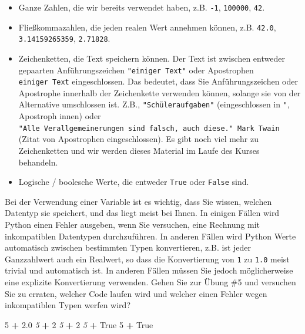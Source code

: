 \documentclass[
]{book}
\newenvironment{Shaded}{\begin{snugshade}}{\end{snugshade}}
\newcommand{\CommentTok}[1]{\textcolor[rgb]{0.56,0.35,0.01}{\textit{#1}}}
\newcommand{\DecValTok}[1]{\textcolor[rgb]{0.00,0.00,0.81}{#1}}
\newcommand{\FloatTok}[1]{\textcolor[rgb]{0.00,0.00,0.81}{#1}}
\newcommand{\OperatorTok}[1]{\textcolor[rgb]{0.81,0.36,0.00}{\textbf{#1}}}
\newcommand{\StringTok}[1]{\textcolor[rgb]{0.31,0.60,0.02}{#1}}
\newcommand{\VariableTok}[1]{\textcolor[rgb]{0.00,0.00,0.00}{#1}}
\providecommand{\tightlist}{%
  \setlength{\itemsep}{0pt}\setlength{\parskip}{0pt}}
\begin{document}
\begin{itemize}
\tightlist
\item
  Ganze Zahlen, die wir bereits verwendet haben, z.B. \texttt{-1}, \texttt{100000}, \texttt{42}.
\item
  Fließkommazahlen, die jeden realen Wert annehmen können, z.B. \texttt{42.0}, \texttt{3.14159265359}, \texttt{2.71828}.
\item
  Zeichenketten, die Text speichern können. Der Text ist zwischen entweder gepaarten Anführungszeichen \texttt{"einiger\ Text"} oder Apostrophen \texttt{\textquotesingle{}einiger\ Text\textquotesingle{}} eingeschlossen. Das bedeutet, dass Sie Anführungszeichen oder Apostrophe innerhalb der Zeichenkette verwenden können, solange sie von der Alternative umschlossen ist. Z.B., \texttt{"Schüleraufgaben"} (eingeschlossen in \texttt{"}, Apostroph \texttt{\textquotesingle{}} innen) oder \texttt{\textquotesingle{}"Alle\ Verallgemeinerungen\ sind\ falsch,\ auch\ diese."\ Mark\ Twain\textquotesingle{}} (Zitat von Apostrophen eingeschlossen). Es gibt noch viel mehr zu Zeichenketten und wir werden dieses Material im Laufe des Kurses behandeln.
\item
  Logische / boolesche Werte, die entweder \texttt{True} oder \texttt{False} sind.
\end{itemize}

Bei der Verwendung einer Variable ist es wichtig, dass Sie wissen, welchen Datentyp sie speichert, und das liegt meist bei Ihnen. In einigen Fällen wird Python einen Fehler ausgeben, wenn Sie versuchen, eine Rechnung mit inkompatiblen Datentypen durchzuführen. In anderen Fällen wird Python Werte automatisch zwischen bestimmten Typen konvertieren, z.B. ist jeder Ganzzahlwert auch ein Realwert, so dass die Konvertierung von \texttt{1} zu \texttt{1.0} meist trivial und automatisch ist. In anderen Fällen müssen Sie jedoch möglicherweise eine explizite Konvertierung verwenden. Gehen Sie zur Übung \#5 und versuchen Sie zu erraten, welcher Code laufen wird und welcher einen Fehler wegen inkompatiblen Typen werfen wird?

\begin{Shaded}
\begin{Highlighting}[]
\DecValTok{5} \OperatorTok{+} \FloatTok{2.0}
\CommentTok{\textquotesingle{}5\textquotesingle{}} \OperatorTok{+} \DecValTok{2}
\CommentTok{\textquotesingle{}5\textquotesingle{}} \OperatorTok{+} \StringTok{\textquotesingle{}2\textquotesingle{}}
\CommentTok{\textquotesingle{}5\textquotesingle{}} \OperatorTok{+} \VariableTok{True}
\DecValTok{5} \OperatorTok{+} \VariableTok{True}
\end{Highlighting}
\end{Shaded}
\end{document}
